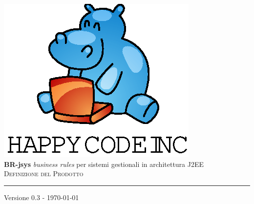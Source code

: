 \documentclass[11pt,titlepage,a4paper]{report}
\begin{document}
\newcommand{\lv}{ 0.3 } %
\newcommand{\dt}{ Definizione del Prodotto }%
\newcommand{\Glossario}{ Glossario.1.4.pdf }
\newcommand{\br}{business rule}
\newcommand{\brs}{business rules}
\newcommand{\bo}{business object}
\newcommand{\bos}{business objects}
\newcommand{\re}{repository}
\newcommand{\brp}{BusinessRuleParser}
\newcommand{\brl}{BusinessRuleLexer}
\newcommand{\BR}{BusinessRule}


\begin{titlepage}\begin{center}
\vspace*{0.5in}
\includegraphics{logo.eps}
\vspace*{0.2in} \\
{\Large \textbf{BR-jsys}}
{\Large \emph{business rules} per sistemi gestionali in architettura J2EE } 
\vspace{2in} \\
\Huge \textsc{ \dt }
\par\rule{10cm}{0.4pt} \par {\large Versione \lv - \today} \\
\end{center}\end{titlepage}
\vspace*{0.5in}
\end{document}
